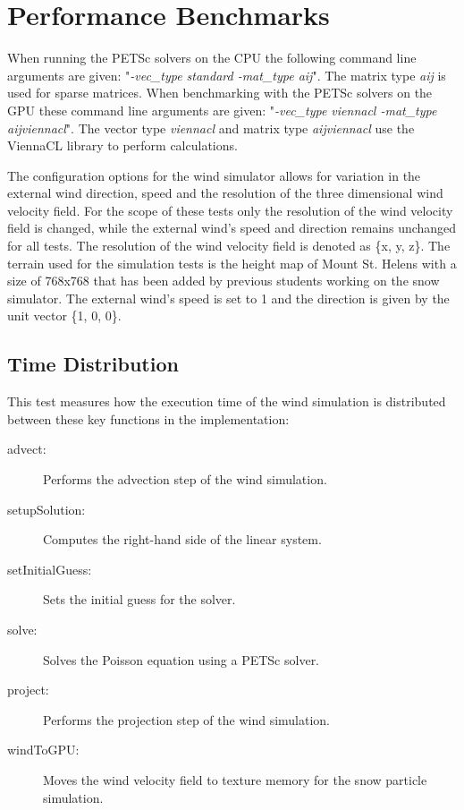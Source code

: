\section{Performance Benchmarks}

When running the PETSc solvers on the CPU the following command line arguments
are given: "\emph{-vec\_type standard -mat\_type aij}". The matrix type
\emph{aij} is used for sparse matrices. When benchmarking with the PETSc solvers
on the GPU these command line arguments are given: "\emph{-vec\_type viennacl
-mat\_type aijviennacl}". The vector type \emph{viennacl} and matrix type
\emph{aijviennacl} use the ViennaCL library to perform calculations.

The configuration options for the wind simulator allows for variation in the
external wind direction, speed and the resolution of the three dimensional wind
velocity field. For the scope of these tests only the resolution of the wind
velocity field is changed, while the external wind's speed and direction remains
unchanged for all tests. The resolution of the wind velocity field is denoted
as \{x, y, z\}. The terrain used for the simulation tests is the height map of
Mount St. Helens with a size of 768x768 that has been added by previous students
working on the snow simulator. The external wind's speed is set to 1 and the
direction is given by the unit vector \{1, 0, 0\}.

\subsection{Time Distribution}

This test measures how the execution time of the wind simulation is distributed
between these key functions in the implementation:
\begin{description}
	\item[advect:] Performs the advection step of the wind simulation.
	\item[setupSolution:] Computes the right-hand side of the linear system.
	\item[setInitialGuess:] Sets the initial guess for the solver.
	\item[solve:] Solves the Poisson equation using a PETSc solver.
	\item[project:] Performs the projection step of the wind simulation.
	\item[windToGPU:] Moves the wind velocity field to texture memory for the
	snow particle simulation.
\end{description}

